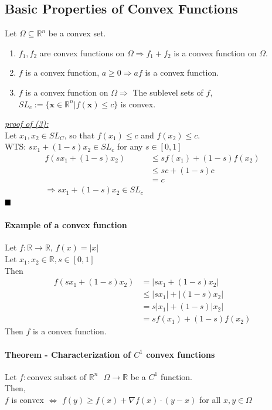 \documentclass[11pt]{article}
\newcommand{\ti}[1]{\textit{#1}}
\newcommand{\tb}[1]{\textbf{#1}}
\newcommand{\real}[0]{\mathbb{R}}
\newcommand{\under}[1]{\underline{#1}}
\newcommand{\vx}[0]{\tb{x}}
\newcommand{\qed}[0]{$\hfill\blacksquare$}
\begin{document}
\subsection{Basic Properties of Convex Functions}
Let $\Omega \subseteq \real^n$ be a convex set.
\begin{enumerate}
	\item $f_1, f_2$ are convex functions on $\Omega \Rightarrow f_1 + f_2$ is a convex function on $\Omega$.
	\item $f$ is a convex function, $a \geq 0 \Rightarrow af$ is a convex function.
	\item $f$ is a convex function on $\Omega \Rightarrow$ The sublevel sets of $f$, $SL_c:=\{\vx \in \real^n | f(\vx) \leq c\}$ is convex.
\end{enumerate}
\under{\ti{proof of (3):}} \\
Let $x_1, x_2 \in SL_C$, so that $f(x_1) \leq c$ and $f(x_2) \leq c$. \\
WTS: $sx_1 + (1-s)x_2 \in SL_c$ for any $s \in [0,1]$
\begin{align*}
	f(sx_1 + (1-s)x_2) &\leq sf(x_1) + (1-s)f(x_2) \tag{$f$ is convex}\\
	&\leq sc + (1-s)c \\
	&= c \\
\Rightarrow sx_1 + (1-s)x_2 \in SL_c
\end{align*}
\qed

\paragraph{Example of a convex function}
Let $f: \real \rightarrow \real, \,f(x) = |x|$ \\
Let $x_1, x_2 \in \real, s \in [0,1]$ \\
Then
\begin{align*}
	f(sx_1 + (1-s)x_2) &= |sx_1 + (1-s)x_2| \\
	&\leq |sx_1| + |(1-s)x_2| \tag{by Triangle Inequality}\\
	&= s|x_1| + (1-s)|x_2| \\
	&= sf(x_1) + (1-s)f(x_2)
\end{align*}
Then $f$ is a convex function.
\paragraph{Theorem - Characterization of $C^1$ convex functions}
Let $f: \text{convex subset of $\real^n$ } \Omega \rightarrow \real$ be a $C^1$ function. \\
Then,\\
$f$ is convex $\iff$ $f(y) \geq f(x) + \nabla f(x)\cdot(y-x)$ 
for all $x,y \in \Omega$
\end{document}

